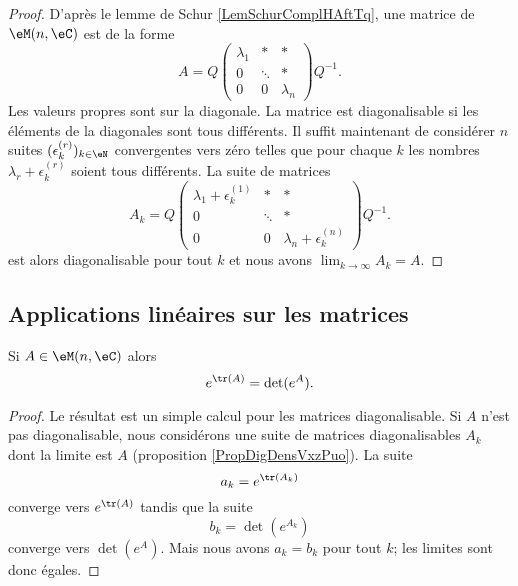 \begin{proof}
    D'après le lemme de Schur \ref{LemSchurComplHAftTq}, une matrice de \( \eM(n,\eC)\) est de la forme
    \begin{equation}
        A=Q\begin{pmatrix}
            \lambda_1    &   *    &   *    \\
              0  &   \ddots    &   *    \\
            0    &   0    &   \lambda_n
        \end{pmatrix}Q^{-1}.
    \end{equation}
    Les valeurs propres sont sur la diagonale. La matrice est diagonalisable si les éléments de la diagonales sont tous différents. Il suffit maintenant de considérer \( n\) suites \( (\epsilon^{(r)}_k)_{k\in\eN}\) convergentes vers zéro telles que pour chaque \( k\) les nombres \( \lambda_r+\epsilon^{(r)}_k\) soient tous différents. La suite de matrices
    \begin{equation}
        A_k=Q\begin{pmatrix}
            \lambda_1+\epsilon^{(1)}_k    &   *    &   *    \\
              0  &   \ddots    &   *    \\
              0    &   0    &   \lambda_n+\epsilon^{(n)}_k
        \end{pmatrix}Q^{-1}.
    \end{equation}
    est alors diagonalisable pour tout \( k\) et nous avons \( \lim_{k\to \infty} A_k=A\).
\end{proof}

\subsection{Applications linéaires sur les matrices}

\begin{proposition}
    Si \( A\in\eM(n,\eC)\) alors
    \begin{equation}
        e^{\tr(A)}=\det( e^{A}).
    \end{equation}
\end{proposition}

\begin{proof}
    Le résultat est un simple calcul pour les matrices diagonalisable. Si \( A\) n'est pas diagonalisable, nous considérons une suite de matrices diagonalisables \( A_k\) dont la limite est \( A\) (proposition \ref{PropDigDensVxzPuo}). La suite
    \begin{equation}
        a_k= e^{\tr(A_k)}
    \end{equation}
    converge vers \(  e^{\tr(A)}\) tandis que la suite 
    \begin{equation}
        b_k=\det( e^{A_k})
    \end{equation}
    converge vers \( \det( e^{A})\). Mais nous avons \( a_k=b_k\) pour tout \( k\); les limites sont donc égales.
\end{proof}

